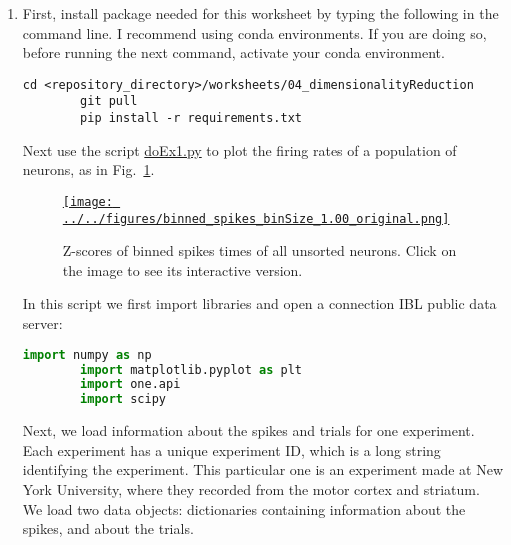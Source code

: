 \documentclass[12pt]{article}
\begin{document}
\begin{enumerate}

    \item First, install package needed for this worksheet by typing the
        following in the command line. I recommend using conda environments. If
        you are doing so, before running the next command, activate your conda
        environment.

        \begin{lstlisting}[backgroundcolor=\color{lightgray}]
        cd <repository_directory>/worksheets/04_dimensionalityReduction
        git pull
        pip install -r requirements.txt
        \end{lstlisting}

        Next use the script
        \href{https://github.com/joacorapela/statNeuro2025/blob/master/worksheets/04_dimensionalityReduction/doEx1.py}{doEx1.py}
        to plot the firing rates of a population of neurons, as in
        Fig.~\ref{fig:ex1}.

        \begin{figure}
            \begin{center}
                \href{https://www.gatsby.ucl.ac.uk/~rapela/statNeuro/2025/worksheets/04_dimensionalityReduction/figures/binned_spikes_binSize_1.00_original.html}{\texttt{[image: ../../figures/binned\_spikes\_binSize\_1.00\_original.png]}}
                \caption{Z-scores of binned spikes times of all unsorted
                neurons. Click on the image to see its interactive version.}
            \end{center}
            \label{fig:ex1}
        \end{figure}

        In this script we first import libraries and open a connection IBL public data
        server:

        \begin{lstlisting}[backgroundcolor=\color{lightgray},language=Python]
        import numpy as np
        import matplotlib.pyplot as plt
        import one.api
        import scipy
        \end{lstlisting}

        Next, we load information about the spikes and trials for one
        experiment. Each experiment has a unique experiment ID, which is a long
        string identifying the experiment. This particular one is an experiment
        made at New York University, where they recorded from the motor cortex
        and striatum.  We load two data objects: dictionaries containing
        information about the spikes, and about the trials.


\end{enumerate}
\end{document}
